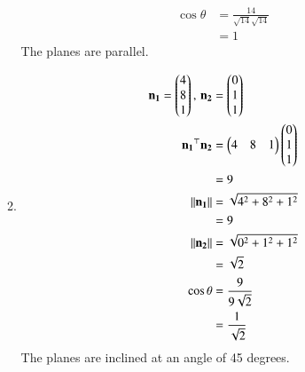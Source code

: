 \documentclass[journal,12pt,twocolumn]{IEEEtran}
\begin{document}
\begin{enumerate}
\begin{enumerate}
\begin{align}
\cos{\theta} &= \frac{14}{\sqrt{14}\sqrt{14}}\\
&= 1
\end{align}
The planes are parallel.
\item
\begin{align}
\mathbf{n_1} = \begin{pmatrix}4\\8\\1\end{pmatrix}, \, \mathbf{n_2} &= \begin{pmatrix}0\\1\\1\end{pmatrix}\\
\mathbf{n_1}^{\top}\mathbf{n_2} &= \begin{pmatrix}4&8&1\end{pmatrix}\begin{pmatrix}0\\1\\1\end{pmatrix}\\
&= 9\\
\left\lVert\mathbf{n_1}\right\rVert &= \sqrt{4^2+8^2+1^2}\\ 
&= 9\\
\left\lVert\mathbf{n_2}\right\rVert &= \sqrt{0^2+1^2+1^2} \\
&= \sqrt{2}\\
\cos{\theta} &= \frac{9}{9\sqrt{2}}\\
&= \frac{1}{\sqrt{2}}
\end{align}
The planes are inclined at an angle of 45 degrees.
\end{enumerate}
\end{enumerate}
\end{document}
